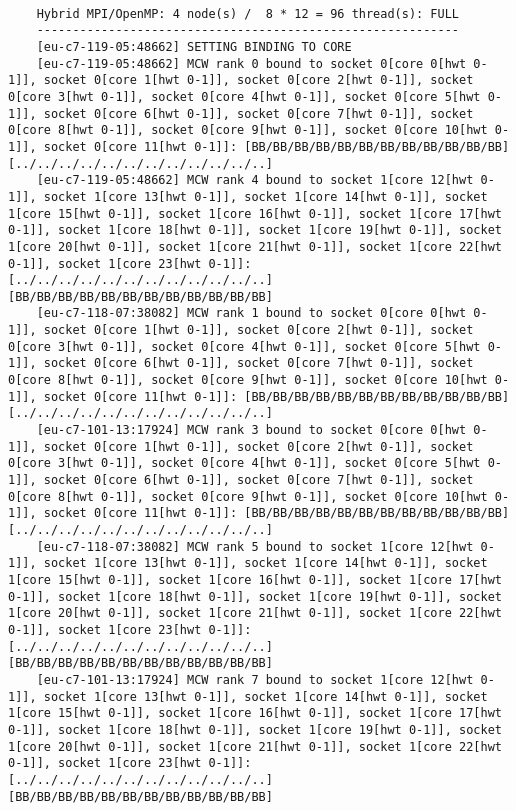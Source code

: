 \documentclass[11pt,a4paper]{article}
\begin{document}
\begin{lstlisting}
	
	Hybrid MPI/OpenMP: 4 node(s) /  8 * 12 = 96 thread(s): FULL
	-----------------------------------------------------------
	[eu-c7-119-05:48662] SETTING BINDING TO CORE
	[eu-c7-119-05:48662] MCW rank 0 bound to socket 0[core 0[hwt 0-1]], socket 0[core 1[hwt 0-1]], socket 0[core 2[hwt 0-1]], socket 0[core 3[hwt 0-1]], socket 0[core 4[hwt 0-1]], socket 0[core 5[hwt 0-1]], socket 0[core 6[hwt 0-1]], socket 0[core 7[hwt 0-1]], socket 0[core 8[hwt 0-1]], socket 0[core 9[hwt 0-1]], socket 0[core 10[hwt 0-1]], socket 0[core 11[hwt 0-1]]: [BB/BB/BB/BB/BB/BB/BB/BB/BB/BB/BB/BB][../../../../../../../../../../../..]
	[eu-c7-119-05:48662] MCW rank 4 bound to socket 1[core 12[hwt 0-1]], socket 1[core 13[hwt 0-1]], socket 1[core 14[hwt 0-1]], socket 1[core 15[hwt 0-1]], socket 1[core 16[hwt 0-1]], socket 1[core 17[hwt 0-1]], socket 1[core 18[hwt 0-1]], socket 1[core 19[hwt 0-1]], socket 1[core 20[hwt 0-1]], socket 1[core 21[hwt 0-1]], socket 1[core 22[hwt 0-1]], socket 1[core 23[hwt 0-1]]: [../../../../../../../../../../../..][BB/BB/BB/BB/BB/BB/BB/BB/BB/BB/BB/BB]
	[eu-c7-118-07:38082] MCW rank 1 bound to socket 0[core 0[hwt 0-1]], socket 0[core 1[hwt 0-1]], socket 0[core 2[hwt 0-1]], socket 0[core 3[hwt 0-1]], socket 0[core 4[hwt 0-1]], socket 0[core 5[hwt 0-1]], socket 0[core 6[hwt 0-1]], socket 0[core 7[hwt 0-1]], socket 0[core 8[hwt 0-1]], socket 0[core 9[hwt 0-1]], socket 0[core 10[hwt 0-1]], socket 0[core 11[hwt 0-1]]: [BB/BB/BB/BB/BB/BB/BB/BB/BB/BB/BB/BB][../../../../../../../../../../../..]
	[eu-c7-101-13:17924] MCW rank 3 bound to socket 0[core 0[hwt 0-1]], socket 0[core 1[hwt 0-1]], socket 0[core 2[hwt 0-1]], socket 0[core 3[hwt 0-1]], socket 0[core 4[hwt 0-1]], socket 0[core 5[hwt 0-1]], socket 0[core 6[hwt 0-1]], socket 0[core 7[hwt 0-1]], socket 0[core 8[hwt 0-1]], socket 0[core 9[hwt 0-1]], socket 0[core 10[hwt 0-1]], socket 0[core 11[hwt 0-1]]: [BB/BB/BB/BB/BB/BB/BB/BB/BB/BB/BB/BB][../../../../../../../../../../../..]
	[eu-c7-118-07:38082] MCW rank 5 bound to socket 1[core 12[hwt 0-1]], socket 1[core 13[hwt 0-1]], socket 1[core 14[hwt 0-1]], socket 1[core 15[hwt 0-1]], socket 1[core 16[hwt 0-1]], socket 1[core 17[hwt 0-1]], socket 1[core 18[hwt 0-1]], socket 1[core 19[hwt 0-1]], socket 1[core 20[hwt 0-1]], socket 1[core 21[hwt 0-1]], socket 1[core 22[hwt 0-1]], socket 1[core 23[hwt 0-1]]: [../../../../../../../../../../../..][BB/BB/BB/BB/BB/BB/BB/BB/BB/BB/BB/BB]
	[eu-c7-101-13:17924] MCW rank 7 bound to socket 1[core 12[hwt 0-1]], socket 1[core 13[hwt 0-1]], socket 1[core 14[hwt 0-1]], socket 1[core 15[hwt 0-1]], socket 1[core 16[hwt 0-1]], socket 1[core 17[hwt 0-1]], socket 1[core 18[hwt 0-1]], socket 1[core 19[hwt 0-1]], socket 1[core 20[hwt 0-1]], socket 1[core 21[hwt 0-1]], socket 1[core 22[hwt 0-1]], socket 1[core 23[hwt 0-1]]: [../../../../../../../../../../../..][BB/BB/BB/BB/BB/BB/BB/BB/BB/BB/BB/BB]

\end{lstlisting}
\end{document}
